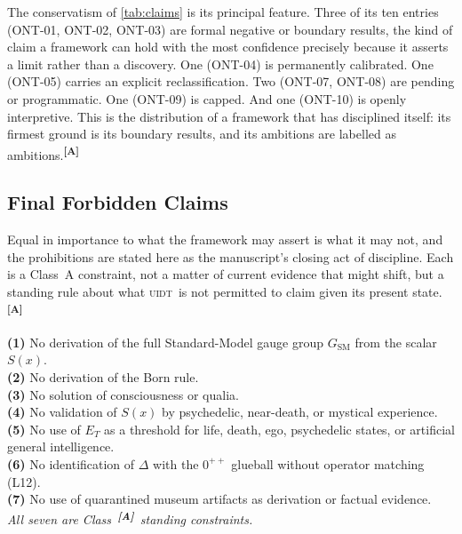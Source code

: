 \documentclass[12pt,a4paper,twoside]{article}
\theoremstyle{plain}
\theoremstyle{definition}
\theoremstyle{remark}
\newcommand{\UIDT}{\textsc{uidt}}
\newcommand{\catmark}[1]{\textsuperscript{\textsf{\textbf{[#1]}}}}
\begin{document}
\noindent The conservatism of \cref{tab:claims} is its principal feature. Three of its ten entries (ONT-01, ONT-02, ONT-03) are formal negative or boundary results, the kind of claim a framework can hold with the most confidence precisely because it asserts a limit rather than a discovery. One (ONT-04) is permanently calibrated. One (ONT-05) carries an explicit reclassification. Two (ONT-07, ONT-08) are pending or programmatic. One (ONT-09) is capped. And one (ONT-10) is openly interpretive. This is the distribution of a framework that has disciplined itself: its firmest ground is its boundary results, and its ambitions are labelled as ambitions.\catmark{A}

\subsection{Final Forbidden Claims}
\label{subsec:forbidden-claims}

Equal in importance to what the framework may assert is what it may not, and the prohibitions are stated here as the manuscript's closing act of discipline. Each is a Class~A constraint, not a matter of current evidence that might shift, but a standing rule about what \UIDT\ is not permitted to claim given its present state.\catmark{A}

\begin{governancebox}
\textbf{(1)} No derivation of the full Standard-Model gauge group
$G_{\mathrm{SM}}$ from the scalar $S(x)$.\\[0.3em]
\textbf{(2)} No derivation of the Born rule.\\[0.3em]
\textbf{(3)} No solution of consciousness or qualia.\\[0.3em]
\textbf{(4)} No validation of $S(x)$ by psychedelic, near-death, or mystical
experience.\\[0.3em]
\textbf{(5)} No use of $E_T$ as a threshold for life, death, ego, psychedelic
states, or artificial general intelligence.\\[0.3em]
\textbf{(6)} No identification of $\Delta$ with the $0^{++}$ glueball without
operator matching (L12).\\[0.3em]
\textbf{(7)} No use of quarantined museum artifacts as derivation or factual
evidence.\\[0.3em]
\emph{All seven are Class~\catmark{A}\ standing constraints.}
\end{governancebox}
\end{document}
